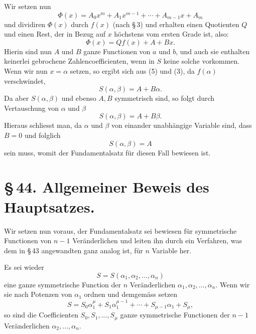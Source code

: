 \documentclass[11pt]{article}
\begin{document}
Wir setzen nun
\begin{equation}
 \Phi(x)=A_0x^m+A_1x^{m-1}+\cdots+A_{m-1}x+A_m
\tag{4}
\end{equation}
und dividiren $\Phi(x)$ durch $f(x)$ (nach \S\,3) und erhalten einen Quotienten $Q$ und einen Rest, der in Bezug auf $x$ höchstens vom ersten Grade ist, also:
\begin{equation}
 \Phi(x)=Qf(x)+A+Bx.
\tag{5}
\end{equation}
Hierin sind nun $A$ und $B$ ganze Functionen von $a$ und $b$, und auch sie enthalten keinerlei gebrochene Zahlencoefficienten, wenn in $S$ keine solche vorkommen. Wenn wir nun $x=\alpha$ setzen, so ergibt sich aus (5) und (3), da $f(\alpha)$ verschwindet,
\begin{equation}
 S(\alpha,\beta)=A+B\alpha.
\tag{6}
\end{equation}
Da aber $S(\alpha,\beta)$ und ebenso $A,B$ symmetrisch sind, so folgt durch Vertauschung von $\alpha$ und $\beta$
\begin{equation}
 S(\alpha,\beta)=A+B\beta.
\tag{7}
\end{equation}
Hieraus schliesst man, da $\alpha$ und $\beta$ von einander unabhängige Variable sind, dass $B=0$ und folglich
\begin{equation}
 S(\alpha,\beta)=A
\tag{8}
\end{equation}
sein muss, womit der Fundamentalsatz für diesen Fall bewiesen ist.

\section*{\S\,44. Allgemeiner Beweis des Hauptsatzes.}

Wir setzen nun voraus, der Fundamentalsatz sei bewiesen für symmetrische Functionen von \(n-1\) Veränderlichen und leiten ihn durch ein Verfahren, was dem in \S\,43 angewandten ganz analog ist, für \(n\) Variable her.

Es sei wieder
\begin{equation}
 S=S(\alpha_1,\alpha_2,\ldots,\alpha_n)
\tag{1}
\end{equation}
eine ganze symmetrische Function der \(n\) Veränderlichen \(\alpha_1,\alpha_2,\ldots,\alpha_n\). Wenn wir sie nach Potenzen von \(\alpha_1\) ordnen und demgemäss setzen
\begin{equation}
 S=S_0\alpha_1^\mu+S_1\alpha_1^{\mu-1}+\cdots+S_{\mu-1}\alpha_1+S_\mu,
\tag{2}
\end{equation}
so sind die Coefficienten \(S_0,S_1,\ldots,S_\mu\) ganze symmetrische Functionen der \(n-1\) Veränderlichen \(\alpha_2,\ldots,\alpha_n\).
\end{document}
